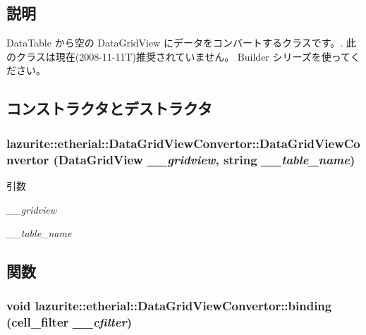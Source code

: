 \subsection{説明}
DataTable から空の DataGridView にデータをコンバートするクラスです。. 此のクラスは現在(2008-\/11-\/11T)推奨されていません。 Builder シリーズを使ってください。 

\subsection{コンストラクタとデストラクタ}
\hypertarget{classlazurite_1_1etherial_1_1_data_grid_view_convertor_a9357a674989a205c57f5ffe3e3da75f1}{
\subsubsection[{DataGridViewConvertor}]{\setlength{\rightskip}{0pt plus 5cm}lazurite::etherial::DataGridViewConvertor::DataGridViewConvertor (DataGridView {\em \_\-\_\-gridview}, \/  string {\em \_\-\_\-table\_\-name})}}
\label{classlazurite_1_1etherial_1_1_data_grid_view_convertor_a9357a674989a205c57f5ffe3e3da75f1}

\begin{DoxyParams}{引数}
\item[{\em \_\-\_\-gridview}]\item[{\em \_\-\_\-table\_\-name}]\end{DoxyParams}


\subsection{関数}
\hypertarget{classlazurite_1_1etherial_1_1_data_grid_view_convertor_ad89359a56e56dde1ca1f85e7fb3e61bd}{
\subsubsection[{binding}]{\setlength{\rightskip}{0pt plus 5cm}void lazurite::etherial::DataGridViewConvertor::binding (cell\_\-filter {\em \_\-\_\-cfilter})}}
\label{classlazurite_1_1etherial_1_1_data_grid_view_convertor_ad89359a56e56dde1ca1f85e7fb3e61bd}

